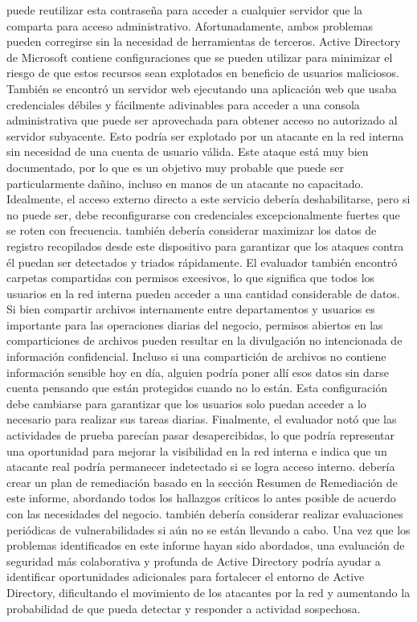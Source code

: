 puede reutilizar esta contraseña para acceder a cualquier servidor que la comparta para acceso administrativo. Afortunadamente, ambos problemas pueden corregirse sin la necesidad de herramientas de terceros. Active Directory de Microsoft contiene configuraciones que se pueden utilizar para
minimizar el riesgo de que estos recursos sean explotados en beneficio de usuarios maliciosos.
También se encontró un servidor web ejecutando una aplicación web que usaba credenciales débiles y fácilmente adivinables para acceder a una
consola administrativa que puede ser aprovechada para obtener acceso no autorizado al
servidor subyacente. Esto podría ser
explotado por un atacante en la red interna sin necesidad de una cuenta de usuario válida. Este ataque está muy bien documentado, por lo que es un objetivo muy probable que puede ser particularmente dañino, incluso en manos de un atacante no capacitado.
Idealmente, el acceso externo directo a este servicio debería deshabilitarse, pero si no puede ser, debe reconfigurarse con
credenciales excepcionalmente fuertes que se roten con frecuencia. \enterpriseName también debería considerar maximizar los datos de registro
recopilados desde este dispositivo para garantizar que los ataques contra él puedan ser detectados y triados rápidamente.
El evaluador también encontró carpetas compartidas con permisos excesivos, lo que significa que todos los usuarios en la red interna pueden acceder
a una cantidad considerable de datos. Si bien compartir archivos internamente entre departamentos y usuarios es importante para las operaciones diarias del
negocio, permisos abiertos en las comparticiones de archivos pueden resultar en la divulgación no intencionada de información
confidencial. Incluso si una compartición de archivos no contiene información sensible hoy en día, alguien podría poner allí esos datos sin darse cuenta pensando que están protegidos cuando no lo están. Esta configuración debe cambiarse para garantizar que los usuarios solo puedan acceder a lo necesario para realizar sus tareas diarias.
Finalmente, el evaluador notó que las actividades de prueba parecían pasar desapercibidas, lo que podría representar una oportunidad para
mejorar la visibilidad en la red interna e indica que un atacante real podría permanecer indetectado si se logra acceso interno. \enterpriseName debería crear un plan de remediación basado en la sección Resumen de Remediación de este
informe, abordando todos los hallazgos críticos lo antes posible de acuerdo con las necesidades del negocio. \enterpriseName también debería
considerar realizar evaluaciones periódicas de vulnerabilidades si aún no se están llevando a cabo. Una vez que los problemas
identificados en este informe hayan sido abordados, una evaluación de seguridad más colaborativa y profunda de Active Directory podría
ayudar a identificar oportunidades adicionales para fortalecer el entorno de Active Directory, dificultando el movimiento de los atacantes
por la red y aumentando la probabilidad de que \enterpriseName pueda detectar y responder a
actividad sospechosa.
